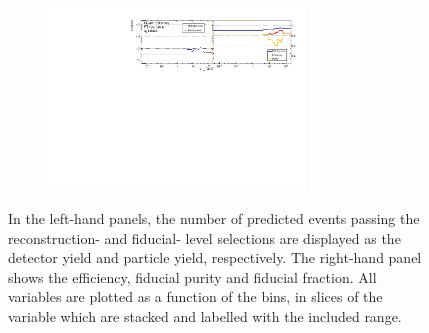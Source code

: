 \begin{figure}[htb]
\begin{subfigure}{.99\textwidth}
    \end{subfigure}
    \begin{subfigure}{.99\textwidth}\centering
        \includegraphics[width = 0.75\textwidth]{Figures/m4l/UnfoldingStudies/v014_inputs/pt34_m4loffshellinputs.pdf}
    \end{subfigure}
    \caption{In the left-hand panels, the number of predicted events passing the reconstruction- and fiducial- level selections are displayed as the detector yield and particle yield, respectively. The right-hand panel shows the efficiency, fiducial purity and fiducial fraction. All variables are plotted as a function of the \ptZTwo bins, in slices of the \mFourL variable which are stacked and labelled with the included \mFourL range.
    \label{fig:ptZ2unf}}
\end{figure}  

\FloatBarrier
\clearpage

